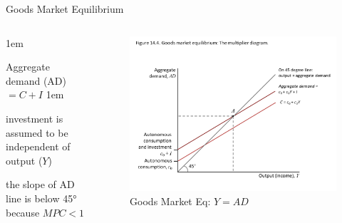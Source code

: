 \documentclass[11pt,aspectratio=43,usenames,dvipsnames]{beamer}
\let\olditemize=\itemize
\let\endolditemize=\enditemize
\renewenvironment{itemize}{\olditemize \itemsep1em}{\endolditemize}
\theoremstyle{definition}
\begin{document}
\begin{frame}{Goods Market Equilibrium}
\label{slide:Goods_Market_Equilibrium}
    \begin{columns}
        \begin{column}{0.3\textwidth}
            \begin{itemize}
                \item Aggregate demand (AD) $ = C + I$
                \begin{itemize}
                    \item investment is assumed to be independent of output ($ Y $)
                \end{itemize}
                \item the slope of AD line is below 45° because $MPC<1$
            \end{itemize}

        \end{column}
        \begin{column}{0.7\textwidth}
            \begin{figure}
                \centering
                \includegraphics[width=\textwidth]{./figures/4.pdf}
                \caption{Goods Market Eq: $ Y = AD $}
            \end{figure}

        \end{column}
    \end{columns}

\end{frame}
\end{document}
